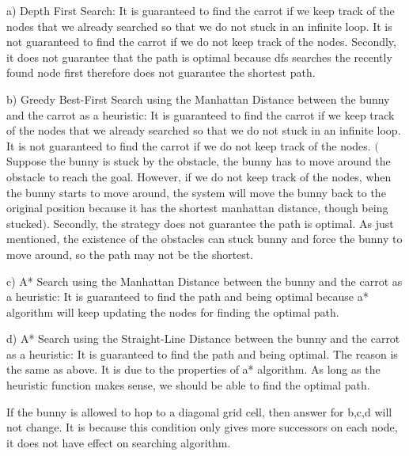 \documentclass[11pt]{article}
\begin{document}
a) Depth First Search: It is guaranteed to find the carrot if we keep track of the nodes that we already searched so that we do not stuck in an infinite loop. It is not guaranteed to find the carrot if we do not keep track of the nodes. Secondly, it does not guarantee that the path is optimal because dfs searches the recently found node first therefore does not guarantee the shortest path. \newline

b) Greedy Best-First Search using the Manhattan Distance between the bunny and the carrot as a heuristic: It is guaranteed to find the carrot if we keep track of the nodes that we already searched so that we do not stuck in an infinite loop. It is not guaranteed to find the carrot if we do not keep track of the nodes. $($Suppose the bunny is stuck by the obstacle, the bunny has to move around the obstacle to reach the goal. However, if we do not keep track of the nodes, when the bunny starts to move around, the system will move the bunny back to the original position because it has the shortest manhattan distance, though being stucked$)$. Secondly, the strategy does not guarantee the path is optimal. As just mentioned, the existence of the obstacles can stuck bunny and force the bunny to move around, so the path may not be the shortest. \newline

c) A* Search using the Manhattan Distance between the bunny and the carrot as a heuristic: It is guaranteed to find the path and being optimal because a* algorithm will keep updating the nodes for finding the optimal path. \newline

d) A* Search using the Straight-Line Distance between the bunny and the carrot as a heuristic: It is guaranteed to find the path and being optimal. The reason is the same as above. It is due to the properties of a* algorithm. As long as the heuristic function makes sense, we should be able to find the optimal path. \newline

If the bunny is allowed to hop to a diagonal grid cell, then answer for b,c,d will not change. It is because this condition only gives more successors on each node, it does not have effect on searching algorithm.\newline





 
\end{document}
